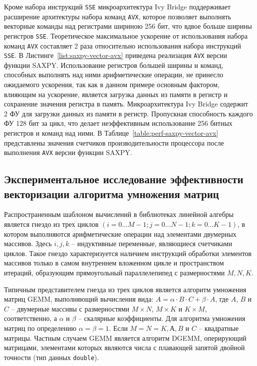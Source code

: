 Кроме набора инструкций \texttt{SSE} микроархитектура Ivy Bridge поддерживает расширение архитектуры набора команд \texttt{AVX}, которое позволяет выполнять векторные команды над регистрами шириною 256 бит, что вдвое больше ширины регистров \texttt{SSE}. Теоретическое максимальное ускорение от использования набора команд \texttt{AVX} составляет 2 раза относительно использования набора инструкций \texttt{SSE}. В Листинге~\ref{list:saxpy-vector-avx} приведена реализация \texttt{AVX} версии функции SAXPY. Использование регистров большей ширины и команд, способных выполнять над ними арифметические операции, не принесло ожидаемого ускорения, так как в данном примере основным фактором, влияющим на ускорение, является загрузка данных из памяти в регистр и сохранение значения регистра в память. Микроархитектура Ivy Bridge содержит 2 ФУ для загрузки данных из памяти в регистр. Пропускная способность каждого ФУ 128 бит за цикл, что делает неэффективным использование 256 битных регистров и команд над ними. В Таблице~\ref{table:perf-saxpy-vector-avx} представлены значения счетчиков производительности процессора после выполнения \texttt{AVX} версии функции SAXPY.

\clearpage
\subsection{Экспериментальное исследование эффективности векторизации алгоритма умножения матриц}
Распространенным шаблоном вычислений в библиотеках линейной алгебры является гнездо из трех циклов $(i = 0 ... M - 1; j = 0 ... N - 1; k = 0 ... K - 1)$, в котором выполняются арифметические операции над элементами двумерных массивов. Здесь $i, j, k$ -- индуктивные переменные, являющиеся счетчиками циклов. Такое гнездо характеризуется наличием инструкций обработки элементов массивов только в самом внутреннем вложенном цикле и пространством итераций, образующим прямоугольный параллелепипед с размерностями $M, N, K$.

Типичным представителем гнезда из трех циклов является алгоритм умножения матриц GEMM, выполняющий вычисления вида: $A = \alpha \cdot B \cdot C + \beta \cdot A$, где $A$, $B$ и $C$ -- двумерные массивы с размерностями $M \times N$, $M \times K$ и $K \times M$, соответственно, а $\alpha$ и $\beta$ -- скалярные коэффициенты. Для алгоритма умножения матриц по определению $\alpha = \beta = 1$. Если $M = N = K, А, B$ и $C$ -- квадратные матрицы. Частным случаем GEMM является алгоритм DGEMM, оперирующий матрицами, элементами которых являются числа с плавающей запятой двойной точности (тип данных \texttt{double}).

